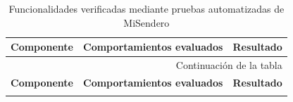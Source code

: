 \begingroup
\small
\setlength{\tabcolsep}{4pt}
\renewcommand{\arraystretch}{1.12}
\begin{longtable}{|p{3cm}|p{7.8cm}|p{3.4cm}|}
    \caption{Funcionalidades verificadas mediante pruebas automatizadas de MiSendero}\label{tab:technical-validation} \\
    \hline
    \textbf{Componente} & \textbf{Comportamientos evaluados} & \textbf{Resultado} \\
    \hline
    \endfirsthead

    \multicolumn{3}{r}{\footnotesize Continuación de la tabla} \\
    \hline
    \textbf{Componente} & \textbf{Comportamientos evaluados} & \textbf{Resultado} \\
    \hline
    \endhead

    \hline
    \endfoot

    \hline
    \endlastfoot


\end{longtable}
